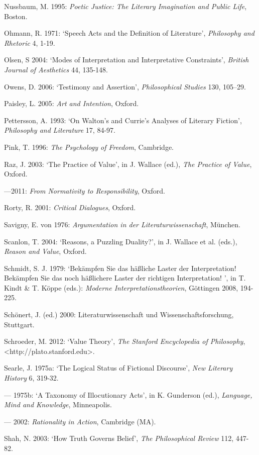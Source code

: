 \begin{hangparas}{.5cm}{1}
Nussbaum, M. 1995: \emph{Poetic Justice: The Literary Imagination and Public Life}, Boston.

Ohmann, R. 1971: `Speech Acts and the Definition of Literature', \emph{Philosophy and Rhetoric} 4, 1-19.

Olsen, S 2004: `Modes of Interpretation and Interpretative Constraints', \emph{British Journal of Aesthetics} 44, 135-148.

Owens, D. 2006: `Testimony and Assertion', \emph{Philosophical Studies} 130, 105--29.

Paisley, L. 2005: \emph{Art and Intention}, Oxford.

Pettersson, A. 1993: `On Walton's and Currie's Analyses of Literary Fiction', \emph{Philosophy and Literature} 17, 84-97.

Pink, T. 1996: \emph{The Psychology of Freedom}, Cambridge.

Raz, J. 2003: `The Practice of Value', in J. Wallace (ed.), \emph{The Practice of Value}, Oxford.

---2011: \emph{From Normativity to Responsibility}, Oxford. 

Rorty, R. 2001: \emph{Critical Dialogues}, Oxford.

Savigny, E. von 1976: \emph{Argumentation in der Literaturwissenschaft}, M\"unchen.

Scanlon, T. 2004: `Reasons, a Puzzling Duality?', in J. Wallace et al. (eds.), \emph{Reason and Value}, Oxford.

Schmidt, S. J. 1979: `Bek\"ampfen Sie das h\"a{\ss}liche Laster der Interpretation! Bek\"ampfen Sie das noch h\"a{\ss}lichere Laster der richtigen Interpretation! ', in T. Kindt \& T. K\"oppe (eds.): \emph{Moderne Interpretationstheorien}, G\"ottingen 2008, 194-225.

Sch\"onert, J. (ed.) 2000: Literaturwissenschaft und Wissenschaftsforschung, Stuttgart.

Schroeder, M. 2012: `Value Theory', \emph{The Stanford Encyclopedia of Philosophy}, \textless{}http://plato.stanford.edu\textgreater{}.

Searle, J. 1975a: `The Logical Status of Fictional Discourse', \emph{New Literary History} 6, 319-32.

--- 1975b: `A Taxonomy of Illocutionary Acts', in K. Gunderson (ed.), \emph{Language, Mind and Knowledge}, Minneapolis.

--- 2002: \emph{Rationality in Action}, Cambridge (MA). 

Shah, N. 2003: `How Truth Governs Belief', \emph{The Philosophical Review} 112, 447-82.


\end{hangparas}
